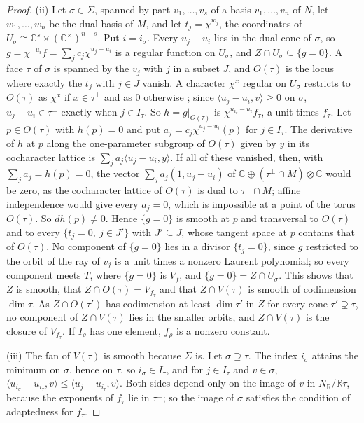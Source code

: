 \documentclass[11pt,reqno]{amsart}
\theoremstyle{plain}
\theoremstyle{definition}
\theoremstyle{remark}
\newcommand{\RR}{\mathbb{R}}
\newcommand{\CC}{\mathbb{C}}
\begin{document}
\begin{proof}
(ii) Let $\sigma\in\Sigma$, spanned by part $v_{1},\dots,v_{s}$ of a basis
$v_{1},\dots,v_{n}$ of $N$, let $w_{1},\dots,w_{n}$ be the dual basis of $M$,
and let $t_{j}=\chi^{w_{j}}$, the coordinates of
$U_{\sigma}\cong\CC^{s}\times(\CC^{\times})^{n-s}$. Put $i=i_{\sigma}$. Every
$u_{j}-u_{i}$ lies in the dual cone of $\sigma$, so
$g=\chi^{-u_{i}}f=\sum_{j}c_{j}\chi^{u_{j}-u_{i}}$ is a regular function on
$U_{\sigma}$, and $Z\cap U_{\sigma}\subseteq\{g=0\}$. A face $\tau$ of
$\sigma$ is spanned by the $v_{j}$ with $j$ in a subset $J$, and $O(\tau)$ is
the locus where exactly the $t_{j}$ with $j\in J$ vanish. A character
$\chi^{x}$ regular on $U_{\sigma}$ restricts to $O(\tau)$ as $\chi^{x}$ if
$x\in\tau^{\perp}$ and as $0$ otherwise \cite[Chapter~3]{CLS11}; since
$\langle u_{j}-u_{i},v\rangle\ge0$ on $\sigma$, $u_{j}-u_{i}\in\tau^{\perp}$
exactly when $j\in I_{\tau}$. So $h=g|_{O(\tau)}$ is
$\chi^{u_{i_{\tau}}-u_{i}}f_{\tau}$, a unit times $f_{\tau}$. Let $p\in
O(\tau)$ with $h(p)=0$ and put $a_{j}=c_{j}\chi^{u_{j}-u_{i}}(p)$ for $j\in
I_{\tau}$. The derivative of $h$ at $p$ along the one-parameter subgroup of
$O(\tau)$ given by $y$ in its cocharacter lattice is $\sum_{j}a_{j}\langle
u_{j}-u_{i},y\rangle$. If all of these vanished, then, with
$\sum_{j}a_{j}=h(p)=0$, the vector $\sum_{j}a_{j}(1,u_{j}-u_{i})$ of
$\CC\oplus(\tau^{\perp}\cap M)\otimes\CC$ would be zero, as the cocharacter
lattice of $O(\tau)$ is dual to $\tau^{\perp}\cap M$; affine independence
would give every $a_{j}=0$, which is impossible at a point of the torus
$O(\tau)$. So $dh(p)\ne0$. Hence $\{g=0\}$ is smooth at $p$ and transversal
to $O(\tau)$ and to every $\{t_{j}=0,\ j\in J'\}$ with $J'\subseteq J$, whose
tangent space at $p$ contains that of $O(\tau)$. No component of $\{g=0\}$
lies in a divisor $\{t_{j}=0\}$, since $g$ restricted to the orbit of the
ray of $v_{j}$ is a unit times a nonzero Laurent polynomial; so every
component meets $T$, where $\{g=0\}$ is $V_{f}$, and
$\{g=0\}=Z\cap U_{\sigma}$. This shows that $Z$ is smooth, that
$Z\cap O(\tau)=V_{f_{\tau}}$ and that $Z\cap V(\tau)$ is smooth of
codimension $\dim\tau$. As $Z\cap O(\tau')$ has codimension at least
$\dim\tau'$ in $Z$ for every cone $\tau'\supsetneq\tau$, no component of
$Z\cap V(\tau)$ lies in the smaller orbits, and $Z\cap V(\tau)$ is the
closure of $V_{f_{\tau}}$. If $I_{\rho}$ has one element, $f_{\rho}$ is a
nonzero constant.

(iii) The fan of $V(\tau)$ is smooth because $\Sigma$ is. Let $\sigma\supseteq
\tau$. The index $i_{\sigma}$ attains the minimum on $\sigma$, hence on
$\tau$, so $i_{\sigma}\in I_{\tau}$, and for $j\in I_{\tau}$ and $v\in\sigma$,
$\langle u_{i_{\sigma}}-u_{i_{\tau}},v\rangle\le\langle
u_{j}-u_{i_{\tau}},v\rangle$. Both sides depend only on the image of $v$ in
$N_{\RR}/\RR\tau$, because the exponents of $f_{\tau}$ lie in $\tau^{\perp}$;
so the image of $\sigma$ satisfies the condition of adaptedness for
$f_{\tau}$.
\end{proof}
\end{document}

